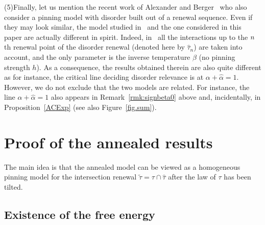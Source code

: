 \documentclass[11pt]{article}
\theoremstyle{definition}
\numberwithin{equation}{section}
\numberwithin{figure}{section}
\numberwithin{table}{section}
\newcommand{\ga}{\alpha}
\newcommand{\gb}{\beta}
\renewcommand{\tilde}{\widetilde}
\newcommand{\htau}{\hat\tau}
\begin{document}
\noindent (5)\enskip Finally, let us mention the recent work of Alexander and Berger~\cite{A17_1} who also consider a pinning model with disorder built out of a renewal sequence. Even if they may look similar, the model studied in~\cite{A17_1} and the one considered in this paper are actually different in spirit. Indeed, in~\cite{A17_1} all the interactions up to the $n\mskip 1mu$th renewal point of the disorder renewal (denoted here by $\htau_n$) are taken into account, and the only parameter is the inverse temperature $\gb$ (no pinning strength $h$). As a consequence, the results obtained therein are also quite different as for instance, the critical line deciding disorder relevance is at $\ga + \hat \ga = 1$. However, we do not exclude that the two models are related. For instance, the line $\ga + \hat \ga = 1$ also appears in Remark~\ref{rmk:signbeta0} above and, incidentally, in Proposition~\ref{ACExp} (see also Figure~\ref{fig.sum}).

\section{Proof of the annealed results}\label{sec3}

The main idea is that the annealed model can be viewed as a homogeneous pinning model for the intersection renewal $\tilde\tau = \tau \cap \htau$ after the law of $\tau$ has been tilted.

\subsection{Existence of the free energy}\label{sec3.1}
\end{document}
